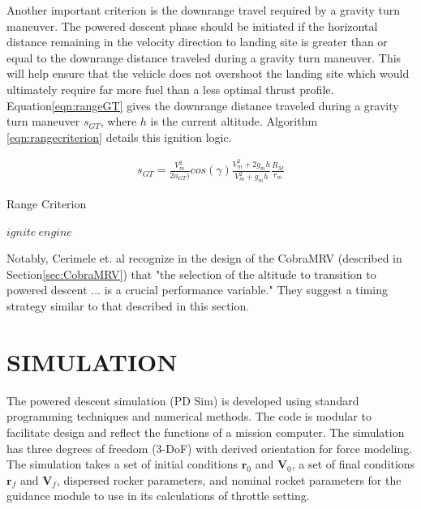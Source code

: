 Another important criterion is the downrange travel required by a gravity turn maneuver. The powered descent phase should be initiated if the horizontal distance remaining in the velocity direction to landing site is greater than or equal to the downrange distance traveled during a gravity turn maneuver. This will help ensure that the vehicle does not overshoot the landing site which would ultimately require far more fuel than a less optimal thrust profile. Equation\:\ref{eqn:rangeGT} gives the downrange distance traveled during a gravity turn maneuver $s_{GT}$, where $h$ is the current altitude. Algorithm \ref{eqn:rangecriterion} details this ignition logic.

\begin{equation}
\label{eqn:rangeGT}
\begin{split}
s_{GT} = \frac{V_m^2}{2a_{GT})}cos(\gamma)\frac{V_m^2+2g_mh}{V_m^2+g_mh}\frac{R_M}{r_m}
\end{split}
\end{equation}

\begin{algorithm}
	\caption{Range Criterion}\label{eqn:rangecriterion}
	\begin{algorithmic}[1]
			\State $ ignite\: engine $
		\EndIf
	\end{algorithmic}
\end{algorithm}

Notably, Cerimele et. al\:\cite{CERIMELE} recognize in the design of the CobraMRV (described in Section\:\ref{sec:CobraMRV}) that "the selection of the altitude to transition to powered descent ... is a crucial performance variable." They suggest a timing strategy similar to that described in this section.

\chapter{SIMULATION} \label{chap:simulation}

The powered descent simulation (PD Sim) is developed using standard programming techniques and numerical methods. The code is modular to facilitate design and reflect the functions of a mission computer. The simulation has three degrees of freedom (3-DoF) with derived orientation for force modeling. The simulation takes a set of initial conditions $\bm{r}_0$ and $\bm{V}_0$, a set of final conditions $\bm{r}_f$ and $\bm{V}_f$, dispersed rocker parameters, and nominal rocket parameters for the guidance module to use in its calculations of throttle setting.

